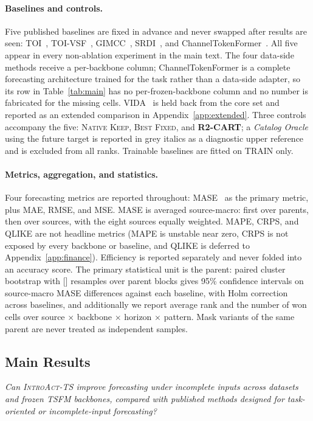 \documentclass{article}
\newcommand{\ph}[1]{\textcolor{phgray}{\textsf{[\detokenize{#1}]}}}
\newcommand{\introact}{\textsc{IntroAct-TS}}
\newcommand{\tsfm}{TSFM}
\begin{document}
\paragraph{Baselines and controls.}
Five published baselines are fixed in advance and never swapped after results are seen:
TOI~\citep{wang2024taskoriented}, TOI-VSF~\citep{hao2025toivsf},
GIMCC~\citep{hao2025gimcc}, SRDI~\citep{xu2026srdi}, and
ChannelTokenFormer~\citep{jang2026channeltokenformer}. All five appear in every
non-ablation experiment in the main text. The four data-side methods receive a per-backbone
column; ChannelTokenFormer is a complete forecasting architecture trained for the task rather
than a data-side adapter, so its row in Table~\ref{tab:main} has no per-frozen-backbone
column and no number is fabricated for the missing cells. VIDA~\citep{liang2025vida} is held
back from the core set and reported as an extended comparison in
Appendix~\ref{app:extended}. Three controls accompany the five: \textsc{Native Keep},
\textsc{Best Fixed}, and \textbf{R2-CART}; a \emph{Catalog Oracle} using the future target is
reported in grey italics as a diagnostic upper reference and is excluded from all ranks.
Trainable baselines are fitted on TRAIN only.

\paragraph{Metrics, aggregation, and statistics.}
Four forecasting metrics are reported throughout: MASE~\citep{hyndman2006mase} as the primary
metric, plus MAE, RMSE, and MSE. MASE is averaged source-macro: first over parents, then over
sources, with the eight sources equally weighted. MAPE, CRPS, and QLIKE are not headline
metrics (MAPE is unstable near zero, CRPS is not exposed by every backbone or baseline, and
QLIKE is deferred to Appendix~\ref{app:finance}). Efficiency is reported separately and
never folded into an accuracy score. The primary statistical unit is the parent: paired
cluster bootstrap with \ph{N_BOOTSTRAP} resamples over parent blocks gives 95\% confidence
intervals on source-macro MASE differences against each baseline, with Holm
correction~\citep{holm1979simple} across baselines, and additionally we report average rank
and the number of won cells over source $\times$ backbone $\times$ horizon $\times$ pattern.
Mask variants of the same parent are never treated as independent samples.

\subsection{Main Results}
\label{sec:exp-main}
\emph{Can \introact{} improve forecasting under incomplete inputs across datasets and frozen
\tsfm{} backbones, compared with published methods designed for task-oriented or
incomplete-input forecasting?}
\end{document}
